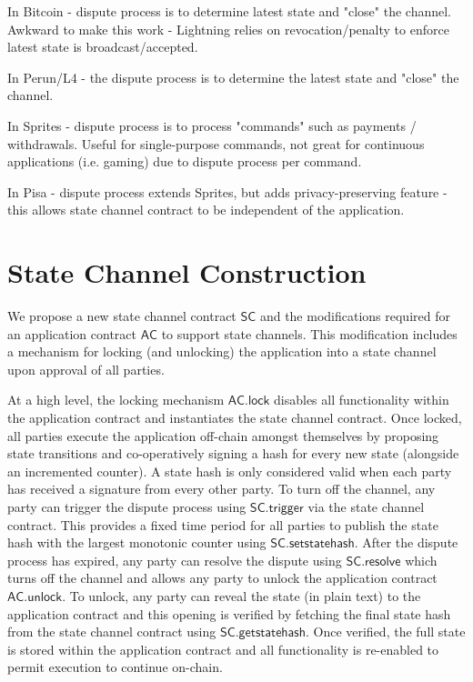 \documentclass{llncs}
\newcommand{\statechannel}{\mathsf{SC}}
\newcommand{\statechanneldispute}{\mathsf{SC}.\mathsf{trigger}}
\newcommand{\statechannelsetstate}{\mathsf{SC}.\mathsf{setstatehash}}
\newcommand{\statechannelresolve}{\mathsf{SC}.\mathsf{resolve}}
\newcommand{\statechannelgetcommitment}{\mathsf{SC}.\mathsf{getstatehash}}
\newcommand{\appcontract}{\mathsf{AC}}
\newcommand{\applock}{\mathsf{AC.lock}}
\newcommand{\appunlock}{\mathsf{AC.unlock}}
\begin{document}
In Bitcoin - dispute process is to determine latest state and "close" the channel. Awkward to make this work - Lightning relies on revocation/penalty to enforce latest state is broadcast/accepted. 

In Perun/L4 - the dispute process is to determine the latest state and "close" the channel. 

In Sprites - dispute process is to process "commands" such as payments / withdrawals. Useful for single-purpose commands, not great for continuous applications (i.e. gaming) due to dispute process per command.

In Pisa - dispute process extends Sprites, but adds privacy-preserving feature - this allows state channel contract to be independent of the application. 

\section{State Channel Construction} 

We propose a new state channel contract $\statechannel$ and the modifications required for an application contract $\appcontract$  to support state channels. 
This modification includes a mechanism for locking (and unlocking) the application into a state channel upon approval of all parties. 

At a high level, the locking mechanism $\applock$ disables all functionality within the application contract and instantiates the state channel contract. 
Once locked, all parties execute the application off-chain amongst themselves by proposing state transitions and co-operatively signing a hash for every new state (alongside an incremented counter). 
A state hash is only considered valid when each party has received a signature from every other party. 
To turn off the channel, any party can trigger the dispute process using $\statechanneldispute$ via the state channel contract.
This provides  a fixed time period  for all parties to publish the state hash with the largest monotonic counter using $\statechannelsetstate$. 
After the dispute process has expired, any party can resolve the dispute using $\statechannelresolve$ which turns off the channel and allows any party to unlock the application contract $\appunlock$. 
To unlock, any party can reveal the state (in plain text) to the application contract and this opening is verified by fetching the final state hash from the state channel contract using  $\statechannelgetcommitment$. 
Once verified, the full state is stored within the application contract and all functionality is re-enabled to permit execution to continue on-chain. 
\end{document}

